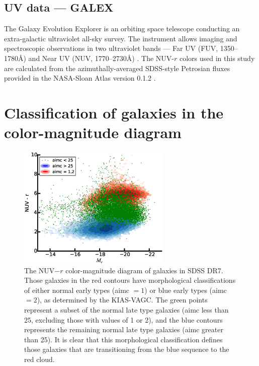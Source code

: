 \subsection{UV data --- GALEX}\label{sec:GALEX}
The Galaxy Evolution Explorer \citep[GALEX]{Martin05} is an orbiting space 
telescope conducting an extra-galactic ultraviolet all-sky survey.  The 
instrument allows imaging and spectroscopic observations in two ultraviolet 
bands --- Far UV (FUV, 1350--1780\AA) and Near UV (NUV, 1770--2730\AA) 
\citep{Morrissey07}.  The NUV-$r$ colors used in this study are calculated from 
the azimuthally-averaged SDSS-style Petrosian fluxes provided in the NASA-Sloan 
Atlas version 0.1.2 \citep[NSA]{Blanton11}.




\section[Results]{Classification of galaxies in the color-magnitude diagram}

\begin{figure}
    \includegraphics[width=0.65\textwidth]{Images/GV/NUVr_CMD_3pop_scatter}
    \caption[NUV-$r$ color-magnitude diagram of SDSS galaxies]{The NUV$-r$ 
    color-magnitude diagram of galaxies in SDSS DR7.  Those galaxies in the red 
    contours have morphological classifications of either normal early types 
    (aimc $=1$) or blue early types (aimc $=2$), as determined by the KIAS-VAGC.  
    The green points represent a subset of the normal late type galaxies (aimc 
    less than 25, excluding those with values of 1 or 2), and the blue contours 
    represents the remaining normal late type galaxies (aimc greater than 25).  
    It is clear that this morphological classification defines those galaxies 
    that are transitioning from the blue sequence to the red cloud.}
    \label{fig:NUVr_CMD}
\end{figure}

